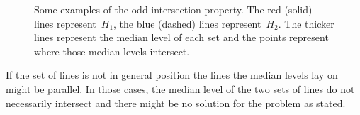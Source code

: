\documentclass{article}
\begin{document}
\begin{figure}[!htbp]
{
    }%
    \caption{Some examples of the odd intersection property. The red (solid) lines represent~$H_1$, the blue (dashed) lines represent~$H_2$. The thicker lines represent the median level of each set and the points represent where those median levels intersect.}
    \label{odd_intersection_examples_picture}
\end{figure}

If the set of lines is not in general position the lines the median levels lay on might be parallel. In those cases, the median level of the two sets of lines do not necessarily intersect and there might be no solution for the problem as stated.
\end{document}
